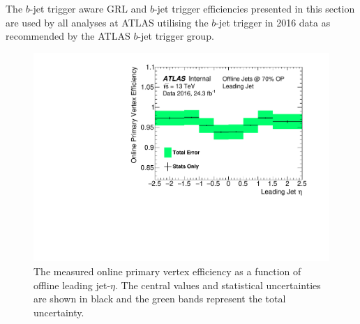 The $b$-jet trigger aware GRL and $b$-jet trigger efficiencies presented in this section
are used by all analyses at ATLAS utilising the $b$-jet trigger in 2016 data as recommended by the ATLAS $b$-jet trigger group.

\begin{figure}[!ht]
  \begin{center}
    \includegraphics[width=0.8\linewidth, angle=0]{figs/Trigger/fullSyst_EventEfficiency_leadingJetEta.pdf}
  \end{center}
  \vspace{-1em}
  \caption[The measured online primary vertex efficiency as a function of offline leading jet-$\eta$.]
          {
    The measured online primary vertex efficiency as a function of offline leading jet-$\eta$.
    The central values and statistical uncertainties are shown in black and the green bands represent the total uncertainty.}
    \label{fig:bTrig_eventSys}
\end{figure}

